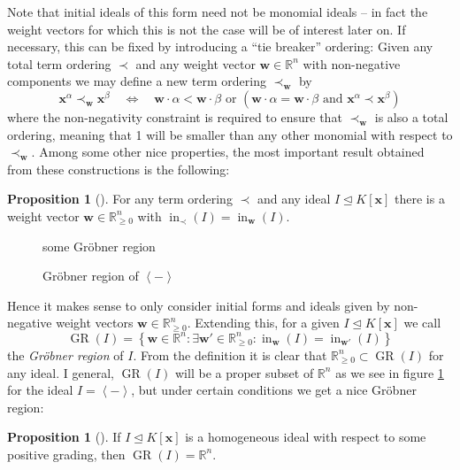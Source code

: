 \documentclass[
  paper=a4,
  DIV=14,
  fontsize=12pt,
  titlepage,
  bibliography=totoc,
  listof=totoc,
  pagesize=pdftex
]{scrartcl}
\numberwithin{figure}{section}
\numberwithin{equation}{section}
\numberwithin{table}{section}
\newcommand*\setR{\mathds{R}}
\newcommand*\ideal[1]{\left\langle #1 \right\rangle}
\let\vec\mathbf
\let\idealof\trianglelefteq
\DeclareMathOperator{\initial}{in}
\DeclareMathOperator{\GR}{GR}
\theoremstyle{definition}
\newtheorem{proposition}[definition]{Proposition}
\numberwithin{definition}{section}
\begin{document}
Note that initial ideals of this form need not be monomial ideals -- in fact the weight
vectors for which this is not the case will be of interest later on. If necessary, this
can be fixed by introducing a \enquote{tie breaker} ordering: Given any total term
ordering $\prec$ and any weight vector $\vec w\in\setR^n$ with non-negative components we
may define a new term ordering $\prec_{\vec w}$ by
\[
  \vec x^\alpha \prec_{\vec w} \vec x^\beta
  \quad\iff\quad
  \vec w \cdot \alpha < \vec w\cdot \beta
  \text{ or }
  \left(
    \vec w \cdot \alpha = \vec w\cdot \beta
    \text{ and }
    \vec x^\alpha \prec \vec x^\beta
  \right)
\]
where the non-negativity constraint is required to ensure that $\prec_{\vec w}$ is also a
total ordering, meaning that 1 will be smaller than any other monomial with respect to
$\prec_{\vec w}$. Among some other nice properties, the most important result obtained
from these constructions is the following:

\begin{proposition}[{\cite[Proposition~1.11]{SturmGBCP}}]
  For any term ordering $\prec$ and any ideal $I \idealof K[\vec x]$ there is a weight
  vector $\vec w \in \setR^n_{\geq0}$ with $\initial_\prec(I) = \initial_{\vec w}(I)$.
\end{proposition}

\begin{figure}[tbh]
  \centering
  some Gröbner region
  \caption{Gröbner region of $\ideal{-}$}
  \label{fig:gr}
\end{figure}

Hence it makes sense to only consider initial forms and ideals given by non-negative
weight vectors $\vec w \in \setR^n_{\geq0}$. Extending this, for a given $I \idealof
K[\vec x]$ we call
\[
  \GR(I) = \left\{
    \vec w \in \setR^n : \exists \vec w' \in \setR^n_{\geq0} :
    \initial_{\vec w}(I) = \initial_{\vec w'}(I)
  \right\}
\]
the \emph{Gröbner region} of $I$. From the definition it is clear that $\setR^n_{\geq0}
\subset \GR(I)$ for any ideal. I general, $\GR(I)$ will be a proper subset of $\setR^n$ as
we see in figure \ref{fig:gr} for the ideal $I=\ideal{-}$, but under certain conditions we
get a nice Gröbner region:

\begin{proposition}[{\cite[Proposition~1.12]{SturmGBCP}}]
  If $I \idealof K[\vec x]$ is a homogeneous ideal with respect to some positive grading,
  then $\GR(I) = \setR^n$.
\end{proposition}
\end{document}

